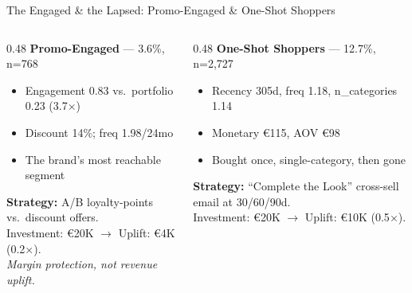 \documentclass[aspectratio=169,10pt]{beamer}
\begin{document}
\begin{frame}{The Engaged \& the Lapsed: Promo-Engaged \& One-Shot Shoppers}
\begin{columns}[T]
  \begin{column}{0.48\textwidth}
    \textbf{\color{accent}Promo-Engaged} --- 3.6\%, n=768
    \begin{itemize}\small
      \item Engagement 0.83 vs.\ portfolio 0.23 (3.7$\times$)
      \item Discount 14\%; freq 1.98/24mo
      \item The brand's most reachable segment
    \end{itemize}
    \textbf{Strategy:} A/B loyalty-points vs.\ discount offers.\\
    Investment: \euro20K $\rightarrow$ Uplift: \euro4K (0.2$\times$).\\[2pt]
    \small\textit{Margin protection, not revenue uplift.}
  \end{column}
  \begin{column}{0.48\textwidth}
    \textbf{\color{accent}One-Shot Shoppers} --- 12.7\%, n=2{,}727
    \begin{itemize}\small
      \item Recency 305d, freq 1.18, n\_categories 1.14
      \item Monetary \euro115, AOV \euro98
      \item Bought once, single-category, then gone
    \end{itemize}
    \textbf{Strategy:} ``Complete the Look'' cross-sell email at 30/60/90d.\\
    Investment: \euro20K $\rightarrow$ Uplift: \euro10K (0.5$\times$).
  \end{column}
\end{columns}
\end{frame}
\end{document}
